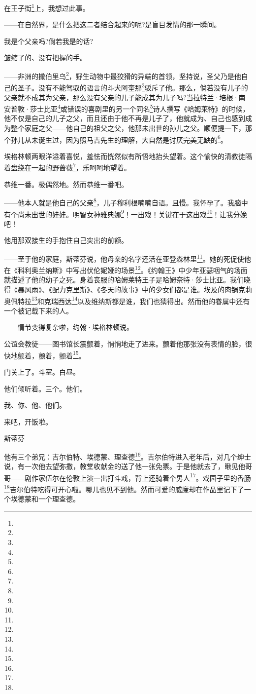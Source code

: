 \par 在王子街\footnote{}上，我想过此事。
\par ——在自然界，是什么把这二者结合起来的呢?是盲目发情的那一瞬间。
\par 我是个父亲吗?倘若我是的话?
\par 皱缩了的、没有把握的手。
\par ——非洲的撒伯里乌\footnote{}，野生动物中最狡猾的异端的首领，坚持说，圣父乃是他自己的圣子。没有不能驾驭的语言的斗犬阿奎那\footnote{}驳斥了他。那么，倘若没有儿子的父亲就不成其为父亲，那么没有父亲的儿子能成其为儿子吗?当拉特兰·培根·南安普敦·莎士比亚\footnote{}或错误的喜剧里的另一个同名\footnote{}诗人撰写《哈姆莱特》的时候，他不仅是自己的儿子之父，而且还由于他不再是儿子了，他就成为、自己也感到成为整个家庭之父——他自己的祖父之父，他那未出世的孙儿之父。顺便提一下，那个孙儿从未诞生过，因为照马吉先生的理解，大自然是讨厌完美无缺的\footnote{}。
\par 埃格林顿两眼洋溢着喜悦，羞怯而恍然似有所悟地抬头望着。这个愉快的清教徒隔着盘绕在一起的野蔷薇\footnote{}，乐呵呵地望着。
\par 恭维一番。极偶然地。然而恭维一番吧。
\par ——他本人就是他自己的父亲\footnote{}，儿子穆利根喃喃自语。且慢。我怀孕了。我脑中有个尚未出世的娃娃。明智女神雅典娜\footnote{}！一出戏！关键在于这出戏\footnote{}！让我分娩吧！
\par 他用那双接生的手抱住自己突出的前额。
\par ——至于他的家庭，斯蒂芬说，他母亲的名字还活在亚登森林里\footnote{}。她的死促使他在《科利奥兰纳斯》中写出伏伦妮娅的场景\footnote{}。《约翰王》中少年亚瑟咽气的场面就描述了他的幼子之死。身着丧服的哈姆莱特王子是哈姆奈特·莎士比亚。我们晓得《暴风雨》、《配力克里斯》、《冬天的故事》中的少女们都是谁。埃及的肉锅克莉奥佩特拉\footnote{}和克瑞西达\footnote{}以及维纳斯都是谁，我们也猜得出。然而他的眷属中还有一个被记载下来的人。
\par ——情节变得复杂啦，约翰·埃格林顿说。
\par 公谊会教徒——图书馆长震颤着，悄悄地走了进来。颤着他那张没有表情的脸，很快地颤着，颤着，颤着\footnote{}。
\par 门关上了。斗室。白昼。
\par 他们倾听着。三个。他们。
\par 我、你、他、他们。
\par 来吧，开饭啦。
\par 斯蒂芬
\par 他有三个弟兄：吉尔伯特、埃德蒙、理查德\footnote{}。吉尔伯特进入老年后，对几个绅士说，有一次他去望弥撒，教堂收献金的送了他一张免票。于是他就去了，瞅见他哥哥——剧作家伍尔在伦敦上演一出打斗戏，背上还骑着个男人\footnote{}。戏园子里的香肠\footnote{}吉尔伯特吃得可开心啦。哪儿也见不到他。然而可爱的威廉却在作品里记下了一个埃德蒙和一个理查德。
